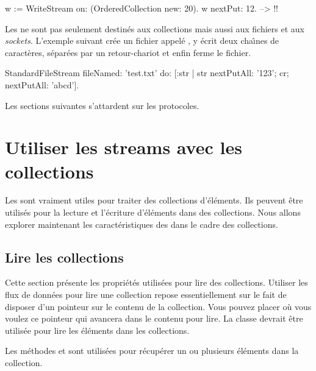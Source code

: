 \documentclass[a4paper,10pt,twoside]{book}
\begin{document}
\begin{code}{}
w := WriteStream on: (OrderedCollection new: 20).
w nextPut: 12. -->  !!
\end{code}

Les \streams ne sont pas seulement destin\'es aux collections mais
aussi aux fichiers et aux \emph{sockets}.
L'exemple suivant cr\'ee un fichier appel\'e , 
y \'ecrit deux cha\^{\i}nes de caract\`eres, s\'epar\'ees par un retour-chariot et enfin ferme le fichier.

\begin{code}{}
StandardFileStream
  fileNamed: 'test.txt'
  do: [:str | str
                nextPutAll: '123';
                cr;
                nextPutAll: 'abcd'].
\end{code}

Les sections suivantes s'attardent sur les protocoles.

\section{Utiliser les streams avec les collections}

Les \streams sont vraiment utiles pour traiter des collections d'\'el\'ements.
Ils peuvent \^etre utilis\'es pour la lecture et l'\'ecriture d'\'el\'ements
dans des collections. Nous allons explorer maintenant les caract\'eristiques
des \streams dans le cadre des collections.

\subsection{Lire les collections}

Cette section pr\'esente les propri\'et\'es utilis\'ees pour lire des collections. Utiliser les flux de donn\'ees pour lire une collection 
repose essentiellement sur le fait de disposer d'un pointeur sur le contenu de la collection.
Vous pouvez placer o\`u vous voulez ce pointeur qui avancera dans le contenu pour lire.
La classe  devrait \^etre utilis\'ee pour lire les \'el\'ements dans les collections.

Les m\'ethodes  et  
sont utilis\'ees pour r\'ecup\'erer un ou plusieurs \'el\'ements dans
la collection.
\end{document}
